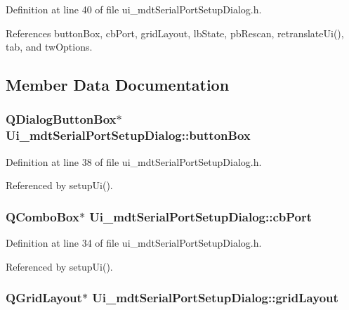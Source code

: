 Definition at line 40 of file ui\-\_\-mdt\-Serial\-Port\-Setup\-Dialog.\-h.



References button\-Box, cb\-Port, grid\-Layout, lb\-State, pb\-Rescan, retranslate\-Ui(), tab, and tw\-Options.



\subsection{Member Data Documentation}
\hypertarget{class_ui__mdt_serial_port_setup_dialog_ad838e2dd8bbfeb9c9dc084d1f7d3e023}{
\subsubsection[{button\-Box}]{\setlength{\rightskip}{0pt plus 5cm}Q\-Dialog\-Button\-Box$\ast$ Ui\-\_\-mdt\-Serial\-Port\-Setup\-Dialog\-::button\-Box}}\label{class_ui__mdt_serial_port_setup_dialog_ad838e2dd8bbfeb9c9dc084d1f7d3e023}


Definition at line 38 of file ui\-\_\-mdt\-Serial\-Port\-Setup\-Dialog.\-h.



Referenced by setup\-Ui().

\hypertarget{class_ui__mdt_serial_port_setup_dialog_afbf0c0bf5fe40ba41986a4548dd32ad1}{
\subsubsection[{cb\-Port}]{\setlength{\rightskip}{0pt plus 5cm}Q\-Combo\-Box$\ast$ Ui\-\_\-mdt\-Serial\-Port\-Setup\-Dialog\-::cb\-Port}}\label{class_ui__mdt_serial_port_setup_dialog_afbf0c0bf5fe40ba41986a4548dd32ad1}


Definition at line 34 of file ui\-\_\-mdt\-Serial\-Port\-Setup\-Dialog.\-h.



Referenced by setup\-Ui().

\hypertarget{class_ui__mdt_serial_port_setup_dialog_a13a11e9f9ccf2a2b55dcb9b90fb4db94}{
\subsubsection[{grid\-Layout}]{\setlength{\rightskip}{0pt plus 5cm}Q\-Grid\-Layout$\ast$ Ui\-\_\-mdt\-Serial\-Port\-Setup\-Dialog\-::grid\-Layout}}\label{class_ui__mdt_serial_port_setup_dialog_a13a11e9f9ccf2a2b55dcb9b90fb4db94}



